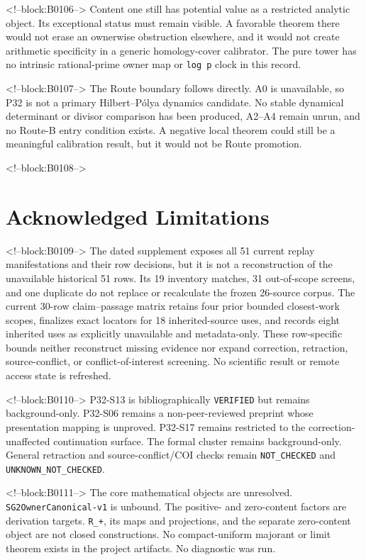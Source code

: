 \documentclass[11pt]{article}
\begin{document}
<!--block:B0106-->
Content one still has potential value as a restricted analytic object.
Its exceptional status must remain visible. A favorable theorem there
would not erase an ownerwise obstruction elsewhere, and it would not
create arithmetic specificity in a generic homology-cover calibrator.
The pure tower has no intrinsic rational-prime owner map or
\texttt{log\ p} clock in this record.

<!--block:B0107-->
The Route boundary follows directly. A0 is unavailable, so P32 is not a
primary Hilbert--Pólya dynamics candidate. No stable dynamical
determinant or divisor comparison has been produced, A2--A4 remain
unrun, and no Route-B entry condition exists. A negative local theorem
could still be a meaningful calibration result, but it would not be
Route promotion.

<!--block:B0108-->
\hypertarget{8-acknowledged-limitations}{%
\section{Acknowledged
Limitations}\label{8-acknowledged-limitations}}

<!--block:B0109-->
The dated supplement exposes all 51 current replay
manifestations and their row decisions, but it is not a reconstruction of the
unavailable historical 51 rows. Its 19 inventory matches, 31 out-of-scope screens,
and one duplicate do not replace or recalculate the frozen 26-source corpus. The
current 30-row claim--passage matrix retains four prior bounded closest-work scopes,
finalizes exact locators for 18 inherited-source uses, and records eight inherited
uses as explicitly unavailable and metadata-only. These row-specific bounds neither
reconstruct missing evidence nor expand correction, retraction, source-conflict, or
conflict-of-interest screening. No scientific result or remote access state is
refreshed.

<!--block:B0110-->
P32-S13 is bibliographically \texttt{VERIFIED} but remains background-only. P32-S06 remains
a non-peer-reviewed preprint whose presentation mapping is unproved.
P32-S17 remains restricted to the correction-unaffected continuation
surface. The formal cluster remains background-only. General retraction
and source-conflict/COI checks remain \texttt{NOT\_CHECKED} and
\texttt{UNKNOWN\_NOT\_CHECKED}.

<!--block:B0111-->
The core mathematical objects are unresolved.
\texttt{SG2OwnerCanonical-v1} is unbound. The positive- and zero-content
factors are derivation targets. \texttt{R\_+}, its maps and projections,
and the separate zero-content object are not closed constructions. No
compact-uniform majorant or limit theorem exists in the project
artifacts. No diagnostic was run.
\end{document}
